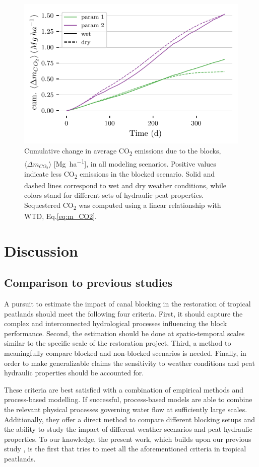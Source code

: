\documentclass[bg, manuscript]{copernicus}
\begin{document}
\begin{figure}[t]
\includegraphics[width=8.3 cm]{figs/all_params_daily_cumulative_CO2.pdf}
\caption{Cumulative change in average CO\textsubscript{2} emissions due to the blocks, $\langle \Delta m_{CO_2} \rangle$ [\unit{Mg ha^{-1}}], in all modeling scenarios. Positive values indicate less CO\textsubscript{2} emissions in the blocked scenario. Solid and dashed lines correspond to wet and dry weather conditions, while colors stand for different sets of hydraulic peat properties. Sequestered CO\textsubscript{2} was computed using a linear relationship with WTD, Eq.\eqref{eq:m_CO2}.}
\label{fig:cum_CO2}
\end{figure}   


\section{Discussion}

\subsection{Comparison to previous studies}
A pursuit to estimate the impact of canal blocking in the restoration of tropical peatlands should meet the following four criteria.
First, it should capture the complex and interconnected hydrological processes influencing the block performance.
Second, the estimation should be done at spatio-temporal scales similar to the specific scale of the  restoration project.
Third, a method to meaningfully compare blocked and non-blocked scenarios is needed.
Finally, in order to make generalizable claims the sensitivity to weather conditions and peat hydraulic properties should be accounted for.

These criteria are best satisfied with a combination of empirical methods and process-based modelling.
If successful, process-based models are  able to combine the relevant  physical processes governing water flow at sufficiently large scales.
Additionally, they offer a direct method to compare different blocking setups and the ability to study the impact of different weather scenarios and peat hydraulic properties.
To our knowledge, the present work, which builds upon our previous study \citep{urzainkiCanalBlockingOptimization2020}, is the first that tries to meet all the aforementioned criteria in tropical peatlands.
\end{document}
